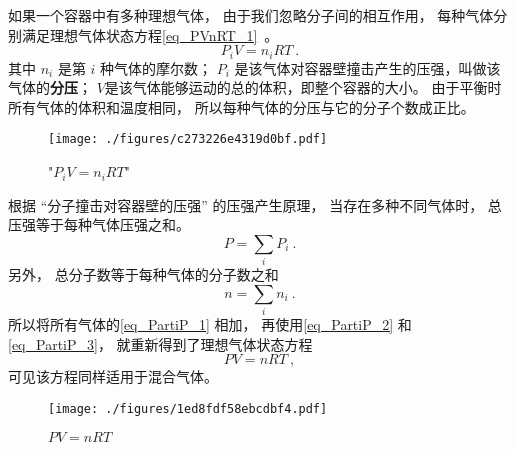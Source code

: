 

如果一个容器中有多种理想气体， 由于我们忽略分子间的相互作用， 每种气体分别满足理想气体状态方程\autoref{eq_PVnRT_1}~。
\begin{equation}\label{eq_PartiP_1}
P_i V = n_i R T~.
\end{equation}
其中 $n_i$ 是第 $i$ 种气体的摩尔数； $P_i$ 是该气体对容器壁撞击产生的压强，叫做该气体的\textbf{分压}； $V$是该气体能够运动的总的体积，即整个容器的大小。 由于平衡时所有气体的体积和温度相同， 所以每种气体的分压与它的分子个数成正比。
\begin{figure}[ht]
\centering
\texttt{[image: ./figures/c273226e4319d0bf.pdf]}
\caption{"$P_i V = n_i R T$"} \label{fig_PartiP_4}
\end{figure}

根据 “分子撞击对容器壁的压强” 的压强产生原理， 当存在多种不同气体时， 总压强等于每种气体压强之和。
\begin{equation}\label{eq_PartiP_2}
P = \sum_i P_i~.
\end{equation}
另外， 总分子数等于每种气体的分子数之和
\begin{equation}\label{eq_PartiP_3}
n = \sum_i n_i~.
\end{equation}
所以将所有气体的\autoref{eq_PartiP_1} 相加， 再使用\autoref{eq_PartiP_2} 和\autoref{eq_PartiP_3}， 就重新得到了理想气体状态方程
\begin{equation}
P V = n RT~,
\end{equation}
可见该方程同样适用于混合气体。

\begin{figure}[ht]
\centering
\texttt{[image: ./figures/1ed8fdf58ebcdbf4.pdf]}
\caption{$P V = n RT$} \label{fig_PartiP_3}
\end{figure}

